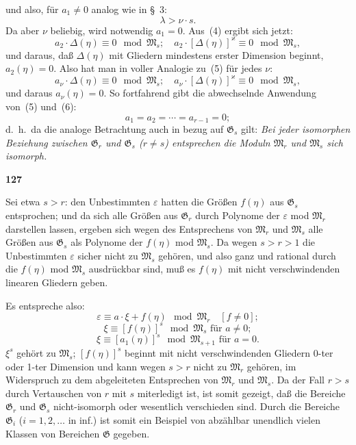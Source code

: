 \documentclass[12pt,a4paper]{article}
\begin{document}
und also, f\"ur $a_1 \neq 0$ analog wie in \S\ 3:
\[\lambda > \nu \cdot s.\]
Da aber $\nu$ beliebig, wird notwendig $a_1 = 0$. Aus~(4) ergibt sich jetzt:
\[a_2 \cdot \Delta(\eta) \equiv 0 \mod \mathfrak{M}_s; \quad a_2 \cdot [\Delta(\eta)]^{\varkappa} \equiv 0 \mod \mathfrak{M}_s,\]
und daraus, da\ss{} $\Delta(\eta)$ mit Gliedern mindestens erster Dimension beginnt, $a_2(\eta) = 0$. Also hat man in voller Analogie zu~(5) f\"ur jedes $\nu$:
\[a_{\nu} \cdot \Delta(\eta) \equiv 0 \mod \mathfrak{M}_s; \quad a_{\nu} \cdot [\Delta(\eta)]^{\varkappa} \equiv 0 \mod \mathfrak{M}_s,\]
und daraus $a_{\nu}(\eta) = 0$. So fortfahrend gibt die abwechselnde Anwendung von~(5) und~(6):
\[a_1 = a_2 = \cdots = a_{r-1} = 0;\]
d.\ h.\ da die analoge Betrachtung auch in bezug auf $\mathfrak{G}_s$ gilt: \emph{Bei jeder isomorphen Beziehung zwischen $\mathfrak{G}_r$ und $\mathfrak{G}_s$ ($r \neq s$) entsprechen die Moduln $\mathfrak{M}_r$ und $\mathfrak{M}_s$ sich isomorph.}

\newpage
\begin{center}
\textbf{127}
\end{center}

Sei etwa $s > r$: den Unbestimmten $\varepsilon$ hatten die Gr\"o\ss en $f(\eta)$ aus $\mathfrak{G}_s$ entsprochen; und da sich alle Gr\"o\ss en aus $\mathfrak{G}_r$ durch Polynome der $\varepsilon$ mod $\mathfrak{M}_r$ darstellen lassen, ergeben sich wegen des Entsprechens von $\mathfrak{M}_r$ und $\mathfrak{M}_s$ alle Gr\"o\ss en aus $\mathfrak{G}_s$ als Polynome der $f(\eta)$ mod $\mathfrak{M}_s$. Da wegen $s > r > 1$ die Unbestimmten $\varepsilon$ sicher nicht zu $\mathfrak{M}_s$ geh\"oren, und also ganz und rational durch die $f(\eta)$ mod $\mathfrak{M}_s$ ausdr\"uckbar sind, mu\ss{} es $f(\eta)$ mit nicht verschwindenden linearen Gliedern geben.

Es entspreche also:
\[\varepsilon \equiv a \cdot \xi + f(\eta) \mod \mathfrak{M}_r \quad [f \neq 0];\]
\[\xi \equiv [f(\eta)]^s \mod \mathfrak{M}_s \text{ f\"ur } a \neq 0;\]
\[\xi \equiv [a_1(\eta)]^s \mod \mathfrak{M}_{s+1} \text{ f\"ur } a = 0.\]
$\xi^s$ geh\"ort zu $\mathfrak{M}_s$; $[f(\eta)]^s$ beginnt mit nicht verschwindenden Gliedern 0-ter oder 1-ter Dimension und kann wegen $s > r$ nicht zu $\mathfrak{M}_r$ geh\"oren, im Widerspruch zu dem abgeleiteten Entsprechen von $\mathfrak{M}_r$ und $\mathfrak{M}_s$. Da der Fall $r > s$ durch Vertauschen von $r$ mit $s$ miterledigt ist, ist somit gezeigt, da\ss{} die Bereiche $\mathfrak{G}_r$ und $\mathfrak{G}_s$ nicht-isomorph oder wesentlich verschieden sind. Durch die Bereiche $\mathfrak{G}_i$ ($i = 1, 2, \ldots$ in inf.) ist somit ein Beispiel von abz\"ahlbar unendlich vielen Klassen von Bereichen $\mathfrak{G}$ gegeben.
\end{document}
